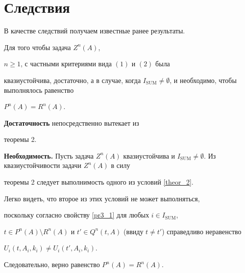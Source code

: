 \section{Следствия}





В качестве следствий получаем известные ранее результаты.





\begin{cor}


Для того чтобы задача $Z^n(A)$,


$n\geq 1$, с частными критериями вида $(1)$ и $(2)$ была


квазиустойчива, достаточно, а в случае, когда $I_{\mathrm{SUM}} \neq


\emptyset$, и необходимо, чтобы выполнялось равенство


$P^n(A)=R^n(A)$.


\end{cor}





\begin{pf}


{\bf Достаточность} непосредственно вытекает из


теоремы 2.





{\bf Необходимость.} Пусть задача $Z^n(A)$ квазиустойчива и $I_{\mathrm{SUM}}


\neq \emptyset$. Из квазиустойчивости задачи $Z^n(A)$ в силу


теоремы 2 следует выполнимость одного из условий \eqref{theor_2}.


Легко видеть, что второе из этих условий не может выполняться,


поскольку согласно свойству \ref{pr3_1} для любых $i\in I_{\mathrm{SUM}}$,


$t\in P^n(A)\setminus R^n(A)$ и $t'\in Q^n(t, A)$ (ввиду $t\neq


t'$) справедливо неравенство


$U_i(t, A_i, k_i)\neq U_i(t', A_i, k_i)$.


Следовательно, верно равенство $P^n(A)=R^n(A)$.


\end{pf}






